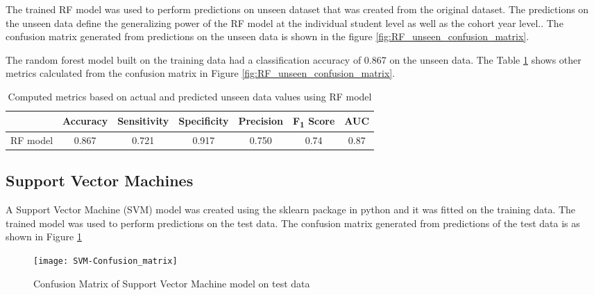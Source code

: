 \documentclass[11pt,openright]{report}
\begin{document}
The trained RF model was used to perform predictions on unseen dataset that was created from the original dataset. The predictions on the unseen data define the generalizing power of the RF model at the individual student level as well as the cohort year level.. The confusion matrix generated from predictions on the unseen data is shown in the figure \ref{fig:RF_unseen_confusion_matrix}.

The random forest model built on the training data had a classification accuracy of 0.867 on the unseen data. The Table \ref{table:RF-unseen_metrics_db} shows other metrics calculated from the confusion matrix in Figure \ref{fig:RF_unseen_confusion_matrix}.

\begin{table}[!htb]
	\renewcommand{\arraystretch}{1.3}
	\caption{Computed metrics based on actual and predicted unseen data values using RF model}
	\label{table:RF-unseen_metrics_db}
	\centering
	\begin{tabular}{|c|c|c|c|c|c|c|}
    \hline
  	 & \bfseries Accuracy & \bfseries Sensitivity & \bfseries Specificity & \bfseries Precision & \bfseries F\textsubscript{1} Score  & \bfseries AUC\\  
    \hline
	RF model & 0.867 & 0.721 & 0.917 & 0.750 & 0.74 & 0.87 \\ \hline
	\end{tabular} 
\end{table}


\subsection {Support Vector Machines}
A Support Vector Machine (SVM) model was created using the sklearn package in python and it was fitted on the training data. The trained model was used to perform predictions on the test data. The confusion matrix generated from predictions of the test data is as shown in Figure \ref{fig:SVM_confusion_matrix}

  \begin{figure}[!htb]
	\centering
	\texttt{[image: SVM-Confusion\_matrix]}
	\caption{Confusion Matrix of Support Vector Machine model on test data}
	\label{fig:SVM_confusion_matrix}
\end{figure} 
\end{document}
